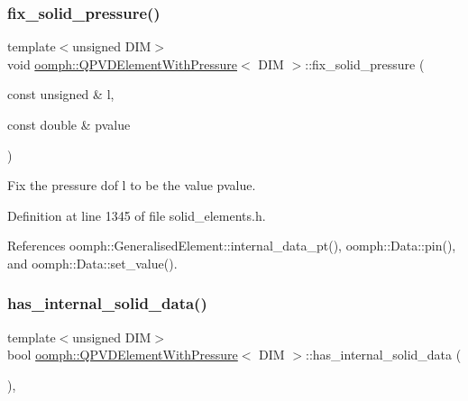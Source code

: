 \subsubsection{\texorpdfstring{fix\+\_\+solid\+\_\+pressure()}{fix\_solid\_pressure()}}
{\footnotesize\ttfamily template$<$unsigned D\+IM$>$ \\
void \hyperlink{classoomph_1_1QPVDElementWithPressure}{oomph\+::\+Q\+P\+V\+D\+Element\+With\+Pressure}$<$ D\+IM $>$\+::fix\+\_\+solid\+\_\+pressure (\begin{DoxyParamCaption}\item[{const unsigned \&}]{l,  }\item[{const double \&}]{pvalue }\end{DoxyParamCaption})\hspace{0.3cm}{\ttfamily [inline]}}



Fix the pressure dof l to be the value pvalue. 



Definition at line 1345 of file solid\+\_\+elements.\+h.



References oomph\+::\+Generalised\+Element\+::internal\+\_\+data\+\_\+pt(), oomph\+::\+Data\+::pin(), and oomph\+::\+Data\+::set\+\_\+value().

\mbox{\label{classoomph_1_1QPVDElementWithPressure_ad94b8af9930b59635389d803b94046ad}} 
\subsubsection{\texorpdfstring{has\+\_\+internal\+\_\+solid\+\_\+data()}{has\_internal\_solid\_data()}}
{\footnotesize\ttfamily template$<$unsigned D\+IM$>$ \\
bool \hyperlink{classoomph_1_1QPVDElementWithPressure}{oomph\+::\+Q\+P\+V\+D\+Element\+With\+Pressure}$<$ D\+IM $>$\+::has\+\_\+internal\+\_\+solid\+\_\+data (\begin{DoxyParamCaption}{ }\end{DoxyParamCaption})\hspace{0.3cm}{\ttfamily [inline]}, {\ttfamily [virtual]}}



